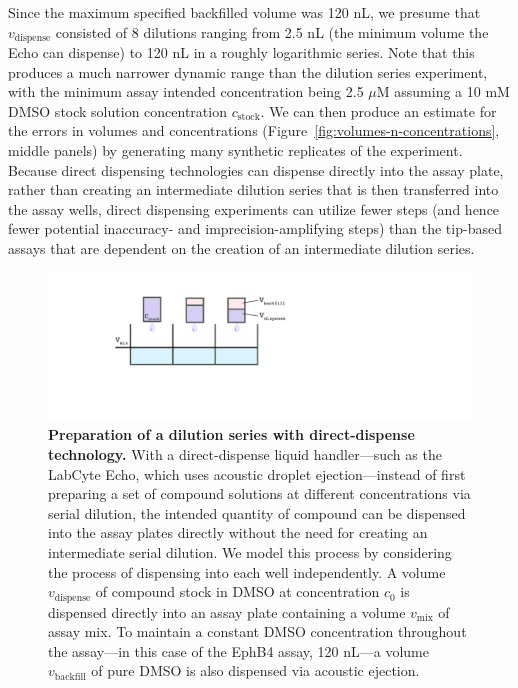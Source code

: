 \documentclass[aps,pre,twocolumn,nofootinbib,superscriptaddress,linenumbers]{revtex4-1}
\begin{document}
Since the maximum specified backfilled volume was 120 nL, we presume that $v_\mathrm{dispense}$ consisted of 8 dilutions ranging from 2.5 nL (the minimum volume the Echo can dispense) to 120 nL in a roughly logarithmic series. 
Note that this produces a much narrower dynamic range than the dilution series experiment, with the minimum assay intended concentration being 2.5 $\mu$M assuming a 10 mM DMSO stock solution concentration $c_\mathrm{stock}$.
We can then produce an estimate for the errors in volumes and concentrations (Figure~\ref{fig:volumes-n-concentrations}, middle panels) by generating many synthetic replicates of the experiment.
Because direct dispensing technologies can dispense directly into the assay plate, rather than creating an intermediate dilution series that is then transferred into the assay wells, direct dispensing experiments can utilize fewer steps (and hence fewer potential inaccuracy- and imprecision-amplifying steps) than the tip-based assays that are dependent on the creation of an intermediate dilution series.

\begin{figure}[tb]
    \includegraphics[width=\columnwidth]{../figures/direct_dispense.pdf}

  \caption{{\bf Preparation of a dilution series with direct-dispense technology.}
  With a direct-dispense liquid handler---such as the LabCyte Echo, which uses acoustic droplet ejection---instead of first preparing a set of compound solutions at different concentrations via serial dilution, the intended quantity of compound can be dispensed into the assay plates directly without the need for creating an intermediate serial dilution.
  We model this process by considering the process of dispensing into each well independently.
  A volume $v_\mathrm{dispense}$ of compound stock in DMSO at concentration $c_0$ is dispensed directly into an assay plate containing a volume $v_\mathrm{mix}$ of assay mix.
  To maintain a constant DMSO concentration throughout the assay---in this case of the EphB4 assay, 120 nL---a volume $v_\mathrm{backfill}$ of pure DMSO is also dispensed via acoustic ejection.
  }
  \label{fig:direct_dispense}
\end{figure}
\end{document}
